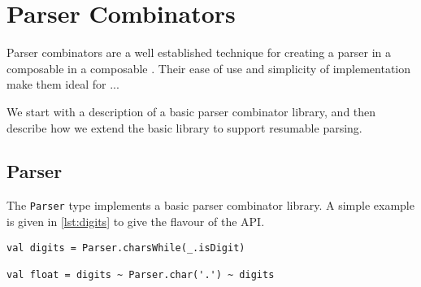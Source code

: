 \section{Parser Combinators}

Parser combinators are a well established technique for creating a parser in a composable in a composable . Their ease of use and simplicity of implementation make them ideal for ...

We start with a description of a basic parser combinator library, and then describe how we extend the basic library to support resumable parsing.


\subsection{Parser}

The \lstinline{Parser} type implements a basic parser combinator library. A simple example is given in \ref{lst:digits} to give the flavour of the API.

\begin{lstlisting}[frame=lines,float,caption={A simple parser to recognise a floating point number}]
val digits = Parser.charsWhile(_.isDigit)

val float = digits ~ Parser.char('.') ~ digits
\end{lstlisting}
